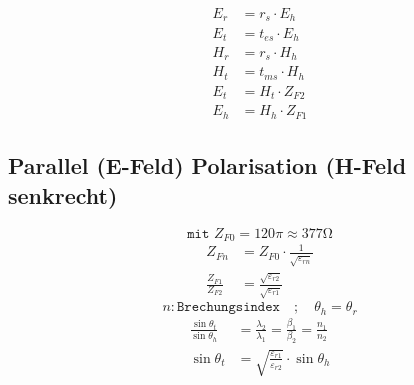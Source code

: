 \begin{align*}
    E_r & = r_s \cdot E_h    \\
    E_t & = t_{es} \cdot E_h \\
    H_r & = r_s \cdot H_h    \\
    H_t & = t_{ms} \cdot H_h \\
    E_t & = H_t\cdot Z_{F2}  \\
    E_h & = H_h\cdot Z_{F1}
\end{align*}

\subsection{Parallel (E-Feld) Polarisation (H-Feld senkrecht)}


\[ \boxed{\texttt{mit } Z_{F0} = 120\pi \approx 377\si{\ohm}} \]
\begin{align*}
    Z_{Fn}                & = Z_{F0}\cdot\frac{1}{\sqrt{\varepsilon_{rn}}}            \\
    \frac{Z_{F1}}{Z_{F2}} & = \frac{\sqrt{\varepsilon_{r2}}}{\sqrt{\varepsilon_{r1}}}
\end{align*}
\[ n: \texttt{Brechungsindex} \quad ; \quad \theta_h = \theta_r\]
\begin{align*}
    \frac{\sin\theta_t}{\sin\theta_h} & = \frac{\lambda_2}{\lambda_1}= \frac{\beta_1}{\beta_2}= \frac{n_1}{n_2} \\
    \sin\theta_t                      & = \sqrt{\frac{\varepsilon_{r1}}{\varepsilon_{r2}}}\cdot\sin\theta_h
\end{align*}

